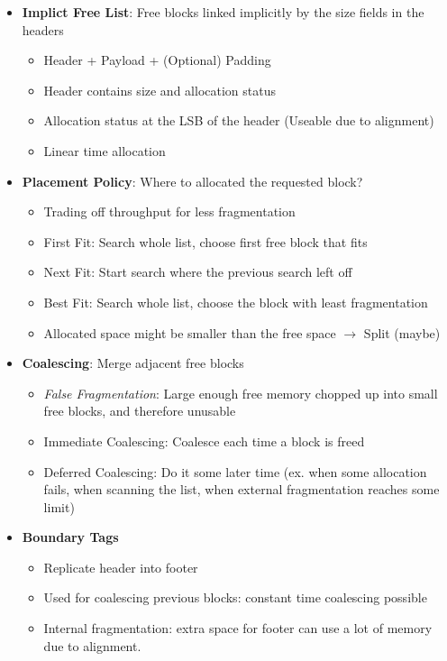 \documentclass[12pt]{article}
\begin{document}
{\begin{itemize}
\begin{itemize}
\begin{itemize}
			\item Depends on future requests
		\end{itemize}
	\end{itemize}
	\item \textbf{Implict Free List}: Free blocks linked implicitly by the size fields in the headers
	\begin{itemize}
		\item Header + Payload + (Optional) Padding
		\item Header contains size and allocation status
		\item Allocation status at the LSB of the header (Useable due to alignment)
		\item Linear time allocation
	\end{itemize}
	\item \textbf{Placement Policy}: Where to allocated the requested block?
	\begin{itemize}
		\item Trading off throughput for less fragmentation
		\item First Fit: Search whole list, choose first free block that fits
		\item Next Fit: Start search where the previous search left off
		\item Best Fit: Search whole list, choose the block with least fragmentation
		\item Allocated space might be smaller than the free space $\rightarrow$ Split (maybe)
	\end{itemize}
	\item \textbf{Coalescing}: Merge adjacent free blocks
	\begin{itemize}
		\item \textit{False Fragmentation}: Large enough free memory chopped up into small free blocks, and therefore unusable
		\item Immediate Coalescing: Coalesce each time a block is freed
		\item Deferred Coalescing: Do it some later time (ex. when some allocation fails, when scanning the list, when external fragmentation reaches some limit)
	\end{itemize}
	\item \textbf{Boundary Tags}
	\begin{itemize}
		\item Replicate header into footer
		\item Used for coalescing previous blocks: constant time coalescing possible
		\item Internal fragmentation: extra space for footer can use a lot of memory due to alignment.

\end{itemize}
\end{itemize}}
\end{document}
